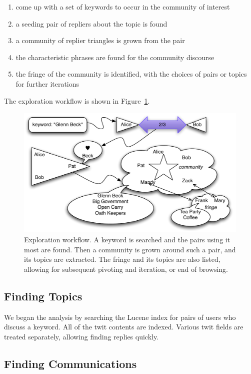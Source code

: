 \begin{enumerate}
	\item come up with a set of keywords to occur in the community of interest
	\item a seeding pair of repliers about the topic is found
	\item a community of replier triangles is grown from the pair
	\item the characteristic phrases are found for the community discourse
	\item the fringe of the community is identified, with the choices of pairs or topics for further iterations
\end{enumerate}

The exploration workflow is shown in Figure~\ref{figure:workflow}.  

\begin{figure}[htp]
\includegraphics{figures/spie-workflow}
\caption{Exploration workflow.  A keyword is searched and the pairs using it most are found.  Then a community is grown around such a pair, and its topics are extracted.  The fringe and its topics are also listed, allowing for subsequent pivoting and iteration, or end of browsing.}
\label{figure:workflow}
\end{figure}
	
\subsection{Finding Topics}

We began the analysis by searching the Lucene index for pairs of users who discuss a keyword.  All of the twit contents are indexed.  Various twit fields are treated separately, allowing finding replies quickly.

\subsection{Finding Communications}

